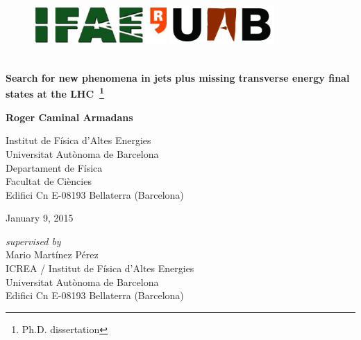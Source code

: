 \thispagestyle{empty}

\begin{titlepage}
\begin{center}

\begin{figure}[h!]
\includegraphics[height=15mm]{Title/IFAE_logo}
\hfill
\includegraphics[height=15mm]{Title/uab_logo}
\end{figure}

\vspace{0.5cm}
\HRule\\
\vspace{0.2cm}
{\huge \bf Search for new phenomena in jets plus missing transverse energy final states at the LHC~\footnote{Ph.D. dissertation}}
\HRule\\
\par
\vspace{1.5in}

{\LARGE \bf Roger Caminal Armadans}
\vspace{0.3cm}
\par
Institut de F\'{i}sica d'Altes Energies\\
Universitat Aut\`{o}noma de Barcelona\\
Departament de F\'{i}sica\\
Facultat de Ci\`{e}ncies \\
Edifici Cn E-08193 Bellaterra (Barcelona)
\par
\vspace{0.5in}

January 9, 2015
\par
\vspace{0.5in}

\vfill
{\it supervised by}\\
Mario Mart\'{i}nez P\'{e}rez\\
ICREA / Institut de F\'{i}sica d'Altes Energies\\
Universitat Aut\`{o}noma de Barcelona\\
Edifici Cn E-08193 Bellaterra (Barcelona)
\end{center}
\end{titlepage}
